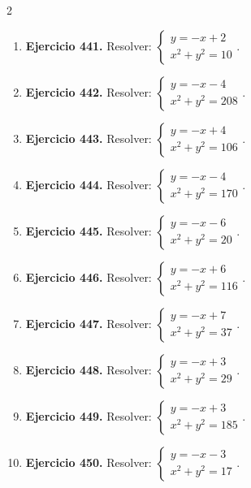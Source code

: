 \documentclass[10pt,a4paper]{article}
\begin{document}
\begin{multicols}{2}
\begin{enumerate}[label=\textbf{\arabic*.}]
\item \textbf{Ejercicio 441.} Resolver: \(\begin{cases}y=-x+2\\x^2+y^2=10\end{cases}\).
\item \textbf{Ejercicio 442.} Resolver: \(\begin{cases}y=-x-4\\x^2+y^2=208\end{cases}\).
\item \textbf{Ejercicio 443.} Resolver: \(\begin{cases}y=-x+4\\x^2+y^2=106\end{cases}\).
\item \textbf{Ejercicio 444.} Resolver: \(\begin{cases}y=-x-4\\x^2+y^2=170\end{cases}\).
\item \textbf{Ejercicio 445.} Resolver: \(\begin{cases}y=-x-6\\x^2+y^2=20\end{cases}\).
\item \textbf{Ejercicio 446.} Resolver: \(\begin{cases}y=-x+6\\x^2+y^2=116\end{cases}\).
\item \textbf{Ejercicio 447.} Resolver: \(\begin{cases}y=-x+7\\x^2+y^2=37\end{cases}\).
\item \textbf{Ejercicio 448.} Resolver: \(\begin{cases}y=-x+3\\x^2+y^2=29\end{cases}\).
\item \textbf{Ejercicio 449.} Resolver: \(\begin{cases}y=-x+3\\x^2+y^2=185\end{cases}\).
\item \textbf{Ejercicio 450.} Resolver: \(\begin{cases}y=-x-3\\x^2+y^2=17\end{cases}\).

\end{enumerate}
\end{multicols}
\end{document}
